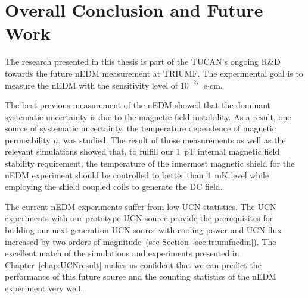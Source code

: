 \section{Overall Conclusion and Future Work}
The research presented in this thesis is part of the TUCAN's ongoing
R\&D towards the future nEDM measurement at TRIUMF. The experimental
goal is to measure the nEDM with the sensitivity level of
$10^{-27}$~e$\cdot$cm.

The best previous measurement of the nEDM showed that the dominant
systematic uncertainty is due to the magnetic field instability. As a
result, one source of systematic uncertainty, the temperature
dependence of magnetic permeability $\mu$, was studied. The result of
those measurements as well as the relevant simulations showed that, to
fulfill our 1~pT internal magnetic field stability requirement, the
temperature of the innermost magnetic shield for the nEDM experiment
should be controlled to better than 4~mK level while employing the
shield coupled coils to generate the DC field.

The current nEDM experiments suffer from low UCN statistics. The UCN
experiments with our prototype UCN source provide the prerequisites
for building our next-generation UCN source with cooling power and UCN
flux increased by two orders of magnitude~(see
Section~\ref{sec:triumfnedm}). The excellent match of the simulations
and experiments presented in Chapter~\ref{chap:UCNresult} makes us
confident that we can predict the performance of this future source
and the counting statistics of the nEDM experiment very well.











